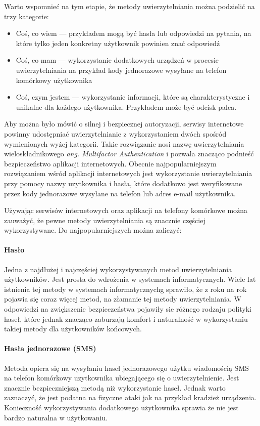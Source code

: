Warto wspomnieć na tym etapie, że metody uwierzytelniania można podzielić na trzy kategorie:
\begin{itemize}
  \item Coś, co wiem --- przykładem mogą być hasła lub odpowiedzi na pytania, na które tylko jeden konkretny użytkownik powinien znać odpowiedź
  \item Coś, co mam --- wykorzystanie dodatkowych urządzeń w procesie uwierzytelniania na przykład kody jednorazowe wysyłane na telefon komórkowy użytkownika
  \item Coś, czym jestem --- wykorzystanie informacji, które są charakterystyczne i unikalne dla każdego użytkownika. Przykładem może być odcisk palca.
\end{itemize}

Aby można było mówić o silnej i bezpiecznej autoryzacji, serwisy internetowe powinny udostępniać uwierzytelnianie z wykorzystaniem dwóch spośród wymienionych wyżej kategorii. Takie rozwiązanie nosi nazwę uwierzytelniania wieloskładnikowego \emph{ang. Multifactor Authentication} i pozwala znacząco podnieść bezpieczeństwo aplikacji internetowych. Obecnie najpopularniejszym rozwiązaniem wśród aplikacji internetowych jest wykorzystanie uwierzytelniania przy pomocy nazwy uzytkownika i hasła, które dodatkowo jest weryfikowane przez kody jednorazowe wysyłane na telefon lub adres e-mail użytkownika.

Używając serwisów internetowych oraz aplikacji na telefony komórkowe można zauważyć, że pewne metody uwierzytelniania są znacznie częściej wykorzystywane. Do najpopularniejszych można zaliczyć:
\paragraph{Hasło} Jedna z najdłużej i najczęściej wykorzystywanych metod uwierzytelniania użytkowników. Jest prosta do wdrożenia w systemach informatycznych. Wiele lat istnienia tej metody w systemach informatycznychg sprawiło, że z roku na rok pojawia się coraz więcej metod, na złamanie tej metody uwierzytelniania. W odpowiedzi na zwiększenie bezpieczeństwa pojawiły sie różnego rodzaju polityki haseł, które jednak znacząco zaburzają komfort i naturalność w wykorzystaniu takiej metody dla użytkowników końcowych.
\paragraph{Hasła jednorazowe (SMS)} Metoda opiera się na wysyłaniu haseł jednorazowego użytku wiadomością SMS na telefon komórkowy uzytkownika ubiegającego się o uwierzytelnienie. Jest znacznie bezpieczniejszą metodą niż wykorzystanie haseł. Jednak warto zaznaczyć, że jest podatna na fizyczne ataki jak na przykład kradzież urządzenia. Konieczność wykorzystywania dodatkowego użytkownika sprawia że nie jest bardzo naturalna w użytkowaniu.

